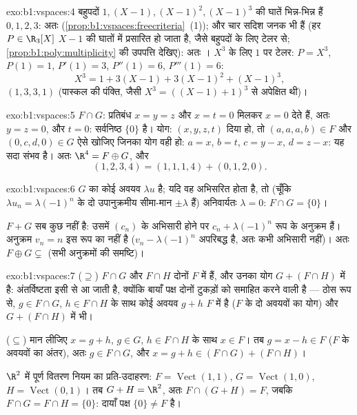 \begin{solution}{exo:b1:vspaces:4}
बहुपदों $1, (X-1), (X-1)^2, (X-1)^3$ की घातें भिन्न-भिन्न हैं $0, 1, 2, 3$:
अतः  (\cref{prop:b1:vspaces:freecriteria}~(1)); और चार  सदिश
जनक भी हैं (हर $P \in \R_3[X]$ $X - 1$ की घातों में प्रसारित हो जाता है,
जैसे बहुपदों के लिए टेलर से; \cref{prop:b1:poly:multiplicity} की उपपत्ति
देखिए): अतः । $X^3$ के लिए $1$ पर टेलर: $P = X^3$, $P(1) = 1$, $P'(1) =
3$, $P''(1) = 6$, $P'''(1) = 6$:
\[
X^3 = 1 + 3(X - 1) + 3(X-1)^2 + (X-1)^3 ,
\]
 $(1, 3, 3, 1)$ (पास्कल की पंक्ति, जैसी $X^3 = ((X-1)+1)^3$ से
अपेक्षित थी)।
\end{solution}

\begin{solution}{exo:b1:vspaces:5}
$F \cap G$: प्रतिबंध $x = y = z$ और $x = t = 0$ मिलकर $x = 0$ देते हैं, अतः
$y = z = 0$, और $t = 0$: सर्वनिष्ठ $\{0\}$ है। योग: $(x,y,z,t)$ दिया हो, तो
$(a,a,a,b) \in F$ और $(0,c,d,0) \in G$ ऐसे खोजिए जिनका योग वही हो: $a = x$,
$b = t$, $c = y - x$, $d = z - x$: यह सदा संभव है। अतः $\R^4 = F \oplus G$,
और
\[
(1,2,3,4) = (1,1,1,4) + (0,1,2,0) .
\]
\end{solution}

\begin{solution}{exo:b1:vspaces:6}
$G$ का कोई अवयव $\lambda u$ है; यदि वह अभिसरित होता है, तो (चूँकि $\lambda
u_n = \lambda(-1)^n$ के दो उपानुक्रमीय सीमा-मान $\pm \lambda$ हैं)
अनिवार्यतः $\lambda = 0$: $F \cap G = \{0\}$।

$F + G$ सब कुछ नहीं है: उसमें $(c_n)$ के अभिसारी होने पर $c_n +
\lambda(-1)^n$ रूप के अनुक्रम हैं। अनुक्रम $v_n = n$ इस रूप का नहीं है ($v_n
- \lambda(-1)^n$ अपरिबद्ध है, अतः कभी अभिसारी नहीं)। अतः $F \oplus G
\subsetneq$ (सभी अनुक्रमों की समष्टि)।
\end{solution}

\begin{solution}{exo:b1:vspaces:7}
($\supseteq$) $F \cap G$ और $F \cap H$ दोनों $F$ में हैं, और उनका योग $G +
(F \cap H)$ में है: अंतर्विष्टता इसी से आ जाती है, क्योंकि बायाँ पक्ष दोनों
टुकड़ों को समाहित करने वाली  है --- ठोस रूप से, $g \in F\cap G$, $h
\in F \cap H$ के साथ कोई अवयव $g + h$ $F$ में है ($F$ के दो अवयवों का योग)
और $G + (F \cap H)$ में भी।

($\subseteq$) मान लीजिए $x = g + h$, $g \in G$, $h \in F \cap H$ के साथ $x
\in F$। तब $g = x - h \in F$ ($F$ के अवयवों का अंतर), अतः $g \in F \cap G$,
और $x = g + h \in (F \cap G) + (F \cap H)$।

$\R^2$ में पूर्ण वितरण नियम का प्रति-उदाहरण: $F = \operatorname{Vect}(1,1)$,
$G = \operatorname{Vect}(1,0)$, $H = \operatorname{Vect}(0,1)$। तब $G + H =
\R^2$, अतः $F \cap (G+H) = F$, जबकि $F \cap G = F \cap H = \{0\}$: दायाँ
पक्ष $\{0\} \neq F$ है।
\end{solution}

